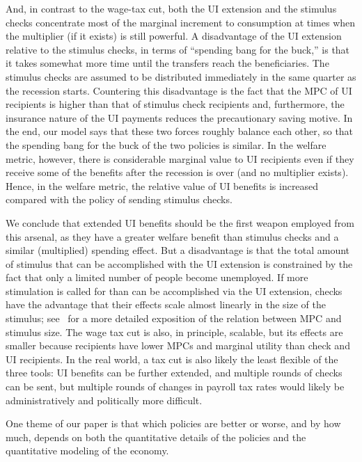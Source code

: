 \documentclass[qe,draft]{econsocart}
\theoremstyle{plain}
\theoremstyle{definition}
\begin{document}
And, in contrast to the wage-tax cut, both the UI extension and the stimulus checks concentrate most of the marginal increment to consumption at times when the multiplier (if it exists) is still powerful.  A disadvantage of the UI extension relative to the stimulus checks, in terms of ``spending bang for the buck,'' is that it takes somewhat more time until the transfers reach the beneficiaries. The stimulus checks are assumed to be distributed immediately in the same quarter as the recession starts. Countering this disadvantage is the fact that the MPC of UI recipients is higher than that of stimulus check recipients and, furthermore, the insurance nature of the UI payments reduces the precautionary saving motive. In the end, our model says that these two forces roughly balance each other, so that the spending bang for the buck of the two policies is similar. In the welfare metric, however, there is considerable marginal value to UI recipients even if they receive some of the benefits after the recession is over (and no multiplier exists). Hence, in the welfare metric, the relative value of UI benefits is increased compared with the policy of sending stimulus checks.

We conclude that extended UI benefits should be the first weapon employed from this arsenal, as they have a greater welfare benefit than stimulus checks and a similar (multiplied) spending effect.  But a disadvantage is that the total amount of stimulus that can be accomplished with the UI extension is constrained by the fact that only a limited number of people become unemployed.  If more stimulation is called for than can be accomplished via the UI extension, checks have the advantage that their effects scale almost linearly in the size of the stimulus; see~\cite{beraja2024size} for a more detailed exposition of the relation between MPC and stimulus size.  The wage tax cut is also, in principle, scalable, but its effects are smaller because recipients have lower MPCs and marginal utility than check and UI recipients.  In the real world, a tax cut is also likely the least flexible of the three tools:  UI benefits can be further extended, and multiple rounds of checks can be sent, but multiple rounds of changes in payroll tax rates would likely be administratively and politically more difficult.

One theme of our paper is that which policies are better or worse, and by how much, depends on both the quantitative details of the policies and the quantitative modeling of the economy.
\end{document}
